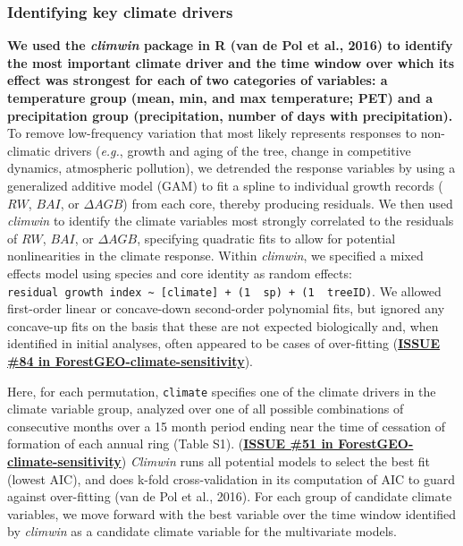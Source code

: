 \documentclass[
]{article}
\begin{document}
\hypertarget{identifying-key-climate-drivers}{%
\subsubsection{Identifying key climate
drivers}\label{identifying-key-climate-drivers}}

\textbf{We used the \emph{climwin} package in R (van de Pol et al.,
2016) to identify the most important climate driver and the time window
over which its effect was strongest for each of two categories of
variables: a temperature group (mean, min, and max temperature; PET) and
a precipitation group (precipitation, number of days with
precipitation).} To remove low-frequency variation that most likely
represents responses to non-climatic drivers (\emph{e.g.}, growth and
aging of the tree, change in competitive dynamics, atmospheric
pollution), we detrended the response variables by using a generalized
additive model (GAM) to fit a spline to individual growth records
(\(RW\), \(BAI\), or \(\Delta AGB\)) from each core, thereby producing
residuals. We then used \emph{climwin} to identify the climate variables
most strongly correlated to the residuals of \(RW\), \(BAI\), or
\(\Delta AGB\), specifying quadratic fits to allow for potential
nonlinearities in the climate response. Within \emph{climwin}, we
specified a mixed effects model using species and core identity as
random effects:
\texttt{residual\ growth\ index\ \textasciitilde{}\ {[}climate{]}\ +\ (1\ \textbar{}\ sp)\ +\ (1\ \textbar{}\ treeID)}.
We allowed first-order linear or concave-down second-order polynomial
fits, but ignored any concave-up fits on the basis that these are not
expected biologically and, when identified in initial analyses, often
appeared to be cases of over-fitting
(\textbf{\href{https://github.com/EcoClimLab/ForestGEO-climate-sensitivity/issues/84}{ISSUE
\#84 in ForestGEO-climate-sensitivity}}).

Here, for each permutation, \texttt{climate} specifies one of the
climate drivers in the climate variable group, analyzed over one of all
possible combinations of consecutive months over a 15 month period
ending near the time of cessation of formation of each annual ring
(Table S1).
(\textbf{\href{https://github.com/EcoClimLab/ForestGEO-climate-sensitivity/issues/51}{ISSUE
\#51 in ForestGEO-climate-sensitivity}}) \emph{Climwin} runs all
potential models to select the best fit (lowest AIC), and does k-fold
cross-validation in its computation of AIC to guard against over-fitting
(van de Pol et al., 2016). For each group of candidate climate
variables, we move forward with the best variable over the time window
identified by \emph{climwin} as a candidate climate variable for the
multivariate models.
\end{document}
